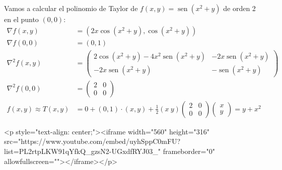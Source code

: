 \begin{ejemplo}
Vamos a calcular el polinomio de Taylor de
$f(x,y)=\operatorname{sen}(x^2+y)$ de orden 2 en el punto $(0,0)$:
%
\begin{align*}
\nabla f(x,y)&= (2x\cos(x^2+y),\cos(x^2+y))\\
\nabla f(0,0)&= (0,1)\\
\nabla^2 f(x,y)&=
\begin{pmatrix}
2\cos(x^2+y)-4x^2\operatorname{sen}(x^2+y) & -2x\operatorname{sen}(x^2+y)\\
-2x\operatorname{sen}(x^2+y) & -\operatorname{sen}(x^2+y)
\end{pmatrix}\\
\nabla^2 f(0,0)&=
\begin{pmatrix}
2 & 0 \\
0 & 0
\end{pmatrix}\\
f(x,y)\approx  T(x,y) & =0+(0,1)\cdot(x,y)+\frac12(x\ y)
\begin{pmatrix}
2 & 0 \\
0 & 0
\end{pmatrix}
\begin{pmatrix}
x \\
y
\end{pmatrix}
=y+x^2\tag*{\fej}
\end{align*}
\end{ejemplo}

\begin{rawhtml}
<p style="text-align: center;"><iframe width="560" height="316" src="https://www.youtube.com/embed/uyhSppC0mFU?list=PL2rtpLKW91qYfkQ_gzsN2-UGxdfRYJ03_" frameborder="0" allowfullscreen=""></iframe></p>
\end{rawhtml}

\newpage

%

